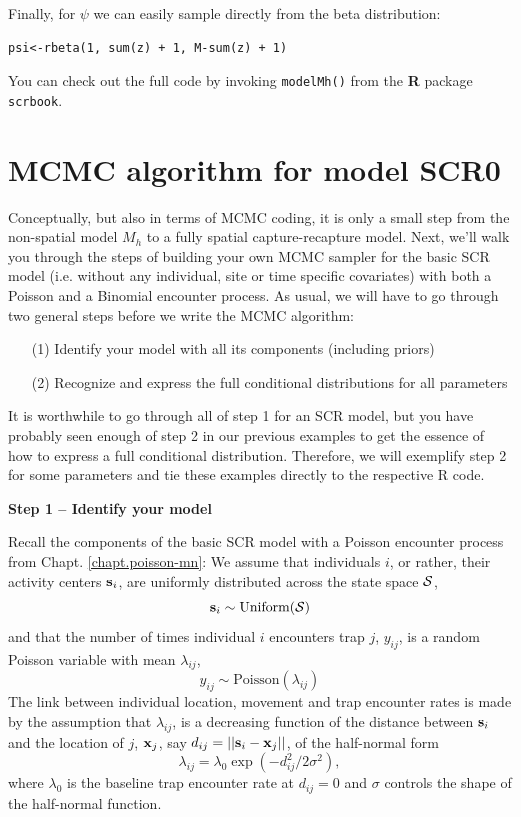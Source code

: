 Finally, for $\psi$ we can easily sample directly from the beta distribution:

\begin{verbatim}
psi<-rbeta(1, sum(z) + 1, M-sum(z) + 1)
\end{verbatim}

You can check out the full code by invoking \mbox{\tt modelMh()} from the {\bf R} package \mbox{\tt scrbook}.

\section{MCMC algorithm for model SCR0}

Conceptually, but also in terms of MCMC coding, it is only a small
step from the non-spatial model $M_h$ to a fully spatial
capture-recapture model. Next, we'll walk you through the steps of
building your own MCMC sampler for the basic SCR model (i.e. without
any individual, site or time specific covariates) with both a Poisson
and a Binomial encounter process.  As usual, we will have to go
through two general steps before we write the MCMC algorithm:
\begin{itemize}
\item[  (1)] Identify your model with all its components (including
    priors)
\item[  (2)] Recognize and express the full conditional distributions for
    all parameters
\end{itemize}
It is worthwhile to go through all of step 1 for an SCR model, but you
have probably seen enough of step 2 in our previous examples to get
the essence of how to express a full conditional
distribution. Therefore, we will exemplify step 2 for some parameters
and tie these examples directly to the respective R code.

{\bf Step 1 -- Identify your model}

Recall the components of the basic SCR model with a Poisson encounter process from Chapt. \ref{chapt.poisson-mn}:
We assume that individuals $i$, or rather, their activity centers
${\bf s}_i$, are uniformly distributed across the state space ${\cal S}$,
\[
{\bf s}_i  \sim \mbox{Uniform}({\cal S})
\]
and that the number of times individual $i$ encounters trap $j$, $y_{ij}$, is a random Poisson variable with mean $\lambda_{ij}$,
\[
y_{ij} \sim \mbox{Poisson}(\lambda_{ij})
\]
The link between individual location, movement and trap encounter
rates is made by the assumption that $\lambda_{ij}$, is a decreasing
function of the distance between ${\bf s}_i$ and the location of $j$,
${\bf x}_{j}$, say $d_{ij} = ||{\bf s}_{i} - {\bf x}_{j}||$, of the half-normal form
\[
\lambda_{ij} =  \lambda_0  \exp(-d_{ij}^2/2\sigma^2),
\]
where $\lambda_0$ is the baseline trap encounter rate at $d_{ij}=0$ and $\sigma$ controls the shape of the half-normal function.

